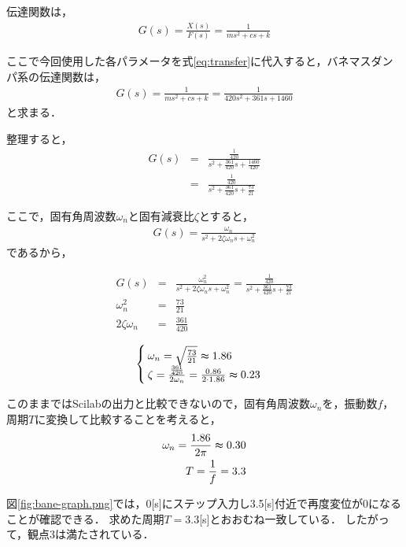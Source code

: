 \documentclass[dvipdfmx,titlepage,a4j]{jsarticle}  %
\begin{document}
伝達関数は，
\begin{eqnarray}
  G(s) = \frac{X(s)}{F(s)} = \frac{1}{m s^2 + c s + k} \label{eq:transfer}
\end{eqnarray}

ここで今回使用した各パラメータを式\ref{eq:transfer}に代入すると，バネマスダンパ系の伝達関数は，
\begin{eqnarray}
  G(s) = \frac{1}{m s^2 + c s + k} = \frac{1}{420 s^2 + 361 s + 1460} \nonumber
\end{eqnarray}
と求まる．

整理すると，
\begin{eqnarray}
  G(s) &=& \frac{\frac{1}{420}}{s^2 + \frac{361}{420} s + \frac{1460}{420}} \nonumber\\
  &=& \frac{\frac{1}{420}}{s^2 + \frac{361}{420} s + \frac{73}{21}}
\end{eqnarray}

ここで，固有角周波数$\omega_n$と固有減衰比$\zeta$とすると，
\begin{eqnarray}
  G(s) = \frac{\omega_n}{s^2 + 2 \zeta \omega_n s + \omega_n^2} \nonumber
\end{eqnarray}
であるから，

\begin{eqnarray}
  G(s) &=& \frac{\omega_n^2}{s^2 + 2 \zeta \omega_n s + \omega_n^2} =  \frac{\frac{1}{420}}{s^2 + \frac{361}{420} s + \frac{73}{21}} \nonumber \\
  \omega_n^2 &=&  \frac{73}{21} \nonumber\\
  2 \zeta \omega_n &=&  \frac{361}{420} \nonumber
\end{eqnarray}

\begin{eqnarray}
  \begin{cases}
    \omega_n = \sqrt{\frac{73}{21}} \thickapprox 1.86 \\
    \zeta = \frac{\frac{361}{420}}{2 \omega_n} = \frac{0.86}{2 \cdot 1.86} \thickapprox 0.23 \label{eq:zeta}
  \end{cases}
\end{eqnarray}

このままではScilabの出力と比較できないので，固有角周波数$\omega_n$を，振動数$f$，周期$T$に変換して比較することを考えると，
\begin{eqnarray}
  \omega_n = \frac{1.86}{2 \pi} \thickapprox 0.30 \nonumber \\
  T = \frac{1}{f} = 3.3
\end{eqnarray}

図\ref{fig:bane-graph.png}では，0[s]にステップ入力し3.5[s]付近で再度変位が0になることが確認できる．
求めた周期$T = 3.3$[s]とおおむね一致している．
したがって，観点3は満たされている．
\end{document}
